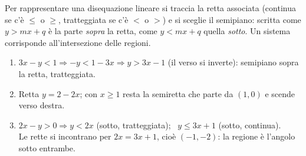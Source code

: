 \begin{question}[ID=1.2, subtitle={Rappresentazione di parti di piano — serie 2}, tags={parti di piano}, difficulty=facile]
\begin{explanation}
Per rappresentare una disequazione lineare si traccia la retta associata (continua se c'è $\leq$ o $\geq$, tratteggiata se c'è $<$ o $>$) e si sceglie il semipiano: scritta come $y>mx+q$ è la parte \emph{sopra} la retta, come $y<mx+q$ quella \emph{sotto}. Un sistema corrisponde all'intersezione delle regioni.
\begin{enumerate}
    \item $3x-y<1 \Rightarrow -y<1-3x \Rightarrow y>3x-1$ (il verso si inverte): semipiano sopra la retta, tratteggiata.
    \item Retta $y=2-2x$; con $x\geq1$ resta la semiretta che parte da $(1,0)$ e scende verso destra.
    \item $2x-y>0 \Rightarrow y<2x$ (sotto, tratteggiata); \ $y\leq3x+1$ (sotto, continua). \\
    Le rette si incontrano per $2x=3x+1$, cioè $(-1,-2)$: la regione è l'angolo sotto entrambe.
\end{enumerate}
\end{explanation}
\end{question}


